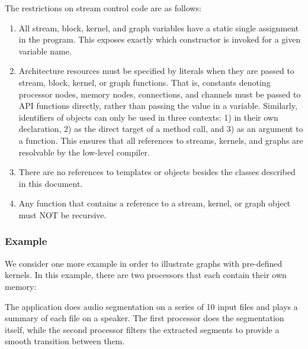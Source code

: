 The restrictions on stream control code are as follows:

\begin{enumerate}

\item All stream, block, kernel, and graph variables have a static
single assignment in the program.  This exposes exactly which
constructor is invoked for a given variable name.

\item Architecture resources must be specified by literals when they
are passed to stream, block, kernel, or graph functions.  That is,
constants denoting processor nodes, memory nodes, connections, and
channels must be passed to API functions directly, rather than passing
the value in a variable.  Similarly, identifiers of objects can only
be used in three contexts: 1) in their own declaration, 2) as the
direct target of a method call, and 3) as an argument to a function.
This ensures that all references to streams, kernels, and graphs are
resolvable by the low-level compiler.

\item There are no references to templates or objects besides the
classes described in this document.

\item Any function that contains a reference to a stream, kernel, or
graph object must NOT be recursive.

\end{enumerate}

\subsubsection{Example}
\label{sec:example}

We consider one more example in order to illustrate graphs with
pre-defined kernels.  In this example, there are two processors that
each contain their own memory:

\begin{figure}[h]
\begin{center}
\end{center}
\vspace{-12pt}
\end{figure}

The application does audio segmentation on a series of 10 input files
and plays a summary of each file on a speaker.  The first processor
does the segmentation itself, while the second processor filters the
extracted segments to provide a smooth transition between them.

